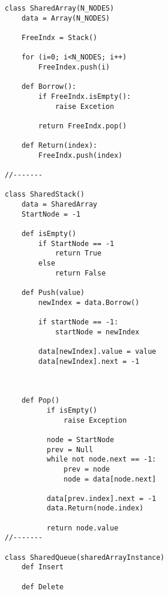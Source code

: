 \documentclass[a4paper,11pt]{article}
\begin{document}
\begin{verbatim}
class SharedArray(N_NODES)
    data = Array(N_NODES)
    
    FreeIndx = Stack()
    
    for (i=0; i<N_NODES; i++)
        FreeIndex.push(i)

    def Borrow():
        if FreeIndx.isEmpty():
            raise Excetion
            
        return FreeIndx.pop()

    def Return(index):
        FreeIndx.push(index)

//-------

class SharedStack()
    data = SharedArray
    StartNode = -1

    def isEmpty()
        if StartNode == -1
            return True
        else
            return False

    def Push(value)
        newIndex = data.Borrow()
        
        if startNode == -1:
            startNode = newIndex
        
        data[newIndex].value = value
        data[newIndex].next = -1
        
        
        
    def Pop()
          if isEmpty()
              raise Exception
        
          node = StartNode
          prev = Null
          while not node.next == -1:
              prev = node
              node = data[node.next]
              
          data[prev.index].next = -1
          data.Return(node.index)
          
          return node.value
//-------   
     
class SharedQueue(sharedArrayInstance)
    def Insert
    
    def Delete
        
        
\end{verbatim}

\end{document}
